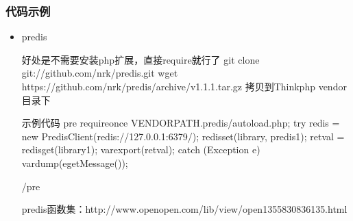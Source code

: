 \documentclass[a4paper,10pt,english]{sphinxmanual}
\begin{document}
\subsubsection{代码示例}
\label{\detokenize{program/redis:id4}}\begin{itemize}
\item {} 
predis

\begin{sphinxVerbatim}[commandchars=\\\{\}]
好处是不需要安装php扩展，直接require就行了
git clone git://github.com/nrk/predis.git
wget https://github.com/nrk/predis/archive/v1.1.1.tar.gz
拷贝到Thinkphp vendor目录下

示例代码
\PYGZlt{}pre\PYGZgt{}
       require\PYGZus{}once VENDOR\PYGZus{}PATH.\PYGZdq{}predis/autoload.php\PYGZdq{};
       try \PYGZob{}
           \PYGZdl{}redis = new Predis\PYGZbs{}Client(\PYGZdq{}redis://127.0.0.1:6379/\PYGZdq{});
           \PYGZdl{}redis\PYGZhy{}\PYGZgt{}set(\PYGZsq{}library\PYGZsq{}, \PYGZsq{}predis1\PYGZsq{});
           \PYGZdl{}retval = \PYGZdl{}redis\PYGZhy{}\PYGZgt{}get(\PYGZsq{}library1\PYGZsq{});
           var\PYGZus{}export(\PYGZdl{}retval);
       \PYGZcb{} catch (Exception \PYGZdl{}e) \PYGZob{}
           var\PYGZus{}dump(\PYGZdl{}e\PYGZhy{}\PYGZgt{}getMessage());
       \PYGZcb{}

\PYGZlt{}/pre\PYGZgt{}

predis函数集：http://www.open\PYGZhy{}open.com/lib/view/open1355830836135.html
\end{sphinxVerbatim}

\end{itemize}
\end{document}

